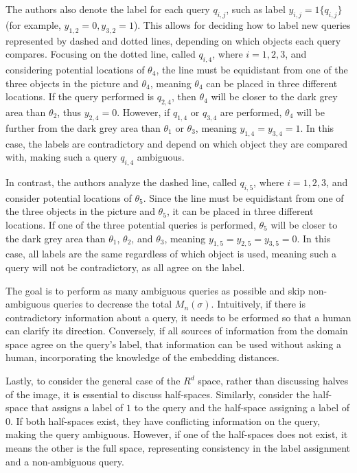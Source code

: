 \documentclass[
  letterpaper,
  numbers=noenddot,
  DIV=11]{scrreprt}
\theoremstyle{definition}
\theoremstyle{plain}
\theoremstyle{plain}
\theoremstyle{remark}
\begin{document}
The authors also denote the label for each query \(q_{i,j}\), such as
label \(y_{i,j} = 1\{q_{i,j}\}\) (for example,
\(y_{1,2} = 0, y_{3,2} = 1\)). This allows for deciding how to label new
queries represented by dashed and dotted lines, depending on which
objects each query compares. Focusing on the dotted line, called
\(q_{i,4}\), where \(i={1,2,3}\), and considering potential locations of
\(\theta_4\), the line must be equidistant from one of the three objects
in the picture and \(\theta_4\), meaning \(\theta_4\) can be placed in
three different locations. If the query performed is \(q_{2,4}\), then
\(\theta_4\) will be closer to the dark grey area than \(\theta_2\),
thus \(y_{2,4} = 0\). However, if \(q_{1,4}\) or \(q_{3,4}\) are
performed, \(\theta_4\) will be further from the dark grey area than
\(\theta_1\) or \(\theta_3\), meaning \(y_{1,4} = y_{3,4} = 1\). In this
case, the labels are contradictory and depend on which object they are
compared with, making such a query \(q_{i,4}\) ambiguous.

In contrast, the authors analyze the dashed line, called \(q_{i,5}\),
where \(i={1,2,3}\), and consider potential locations of \(\theta_5\).
Since the line must be equidistant from one of the three objects in the
picture and \(\theta_5\), it can be placed in three different locations.
If one of the three potential queries is performed, \(\theta_5\) will be
closer to the dark grey area than \(\theta_1\), \(\theta_2\), and
\(\theta_3\), meaning \(y_{1,5} = y_{2,5} = y_{3,5} = 0\). In this case,
all labels are the same regardless of which object is used, meaning such
a query will not be contradictory, as all agree on the label.

The goal is to perform as many ambiguous queries as possible and skip
non-ambiguous queries to decrease the total \(M_n(\sigma)\).
Intuitively, if there is contradictory information about a query, it
needs to be erformed so that a human can clarify its direction.
Conversely, if all sources of information from the domain space agree on
the query's label, that information can be used without asking a human,
incorporating the knowledge of the embedding distances.

Lastly, to consider the general case of the \(R^d\) space, rather than
discussing halves of the image, it is essential to discuss half-spaces.
Similarly, consider the half-space that assigns a label of \(1\) to the
query and the half-space assigning a label of \(0\). If both half-spaces
exist, they have conflicting information on the query, making the query
ambiguous. However, if one of the half-spaces does not exist, it means
the other is the full space, representing consistency in the label
assignment and a non-ambiguous query.
\end{document}
